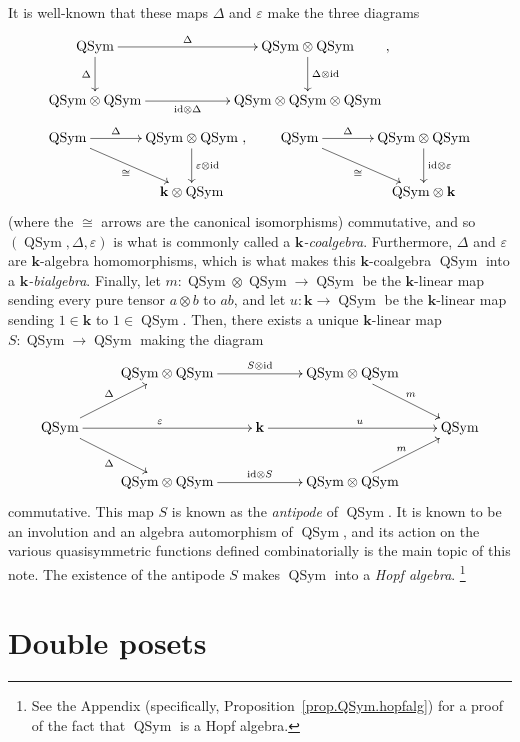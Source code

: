\documentclass[numbers=enddot,12pt,final,onecolumn,notitlepage,abstracton]{scrartcl}
\theoremstyle{definition}
\newenvironment{verlong}{}{}
\newcommand{\kk}{{\mathbf{k}}}
\newcommand{\id}{{\operatorname{id}}}
\newcommand{\QSym}{{\operatorname{QSym}}}
\newcommand{\bk}{{\mathbf{k}}}
\begin{document}
It is well-known that these maps $\Delta$ and
$\varepsilon$ make the three diagrams
\begin{align*}
& \xymatrixcolsep{5pc}\xymatrix{
\QSym\ar[r]^-{\Delta} \ar[d]_{\Delta} & \QSym\otimes\QSym\ar[d]^{\Delta
\otimes\id} \\
\QSym\otimes\QSym\ar[r]_-{\id\otimes\Delta} & \QSym\otimes\QSym\otimes\QSym}
, \\
& \xymatrixcolsep{3pc}
\xymatrix{
\QSym\ar[dr]_{\cong} \ar[r]^-{\Delta} & \QSym\otimes\QSym\ar[d]^-{\varepsilon
\otimes\id} \\
& \bk\otimes\QSym}
,
\qquad
\xymatrixcolsep{3pc}
\xymatrix{
\QSym\ar[dr]_{\cong} \ar[r]^-{\Delta} & \QSym\otimes\QSym\ar[d]^-{\id
\otimes\varepsilon} \\
& \QSym\otimes\bk}
\end{align*}
(where the $\cong$ arrows are the canonical isomorphisms)
commutative, and so $\left(\QSym, \Delta, \varepsilon\right)$ is what
is commonly called a \textit{$\kk$-coalgebra}. Furthermore, $\Delta$
and $\varepsilon$ are $\kk$-algebra homomorphisms, which is what makes
this $\kk$-coalgebra $\QSym$ into a \textit{$\kk$-bialgebra}. Finally,
let $m : \QSym \otimes \QSym \to \QSym$ be the $\kk$-linear map sending
every pure tensor $a \otimes b$ to $ab$, and let $u : \kk \to \QSym$ be
the $\kk$-linear map sending $1 \in \kk$ to $1 \in \QSym$. Then, there
exists a unique $\kk$-linear map $S : \QSym \to \QSym$ making the
diagram
\begin{equation}
\xymatrix{
& \QSym \otimes \QSym \ar[rr]^{S \otimes \id} & & \QSym \otimes \QSym \ar[dr]^{m} & \\
\QSym \ar[ur]^{\Delta} \ar[rr]^{\varepsilon} \ar[dr]_{\Delta} & & \kk \ar[rr]^{u} & & \QSym \\
& \QSym \otimes \QSym \ar[rr]^{\id \otimes S} & & \QSym \otimes \QSym \ar[ur]^{m} & 
}
\label{eq.antipode}
\end{equation}
commutative. This map $S$ is known as the \textit{antipode} of $\QSym$.
It is known to be an involution and an algebra automorphism of $\QSym$,
and its action on the various quasisymmetric functions defined
combinatorially is the main topic of this note.
The existence of the antipode $S$ makes $\QSym$ into a
\textit{Hopf algebra}.
\begin{verlong}
\footnote{See the Appendix
(specifically, Proposition~\ref{prop.QSym.hopfalg})
for a proof of the fact that $\QSym$ is a Hopf algebra.}
\end{verlong}

\section{Double posets}
\label{sect.double-posets}
\end{document}
